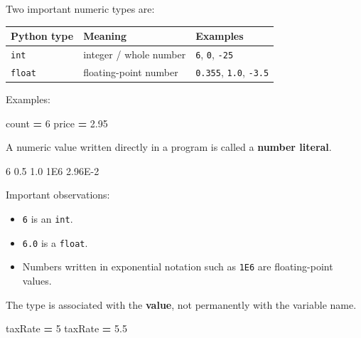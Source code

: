 \documentclass[
]{article}
\newenvironment{Shaded}{\begin{snugshade}}{\end{snugshade}}
\newcommand{\DecValTok}[1]{\textcolor[rgb]{0.00,0.00,0.81}{#1}}
\newcommand{\FloatTok}[1]{\textcolor[rgb]{0.00,0.00,0.81}{#1}}
\newcommand{\NormalTok}[1]{#1}
\newcommand{\OperatorTok}[1]{\textcolor[rgb]{0.81,0.36,0.00}{\textbf{#1}}}
\newcounter{none} %
\providecommand{\tightlist}{%
  \setlength{\itemsep}{0pt}\setlength{\parskip}{0pt}}
\begin{document}
Two important numeric types are:

{\def\LTcaptype{none} %
\begin{longtable}[]{@{}lll@{}}
\toprule\noalign{}
Python type & Meaning & Examples \\
\midrule\noalign{}
\endhead
\bottomrule\noalign{}
\endlastfoot
\texttt{int} & integer / whole number & \texttt{6}, \texttt{0},
\texttt{-25} \\
\texttt{float} & floating-point number & \texttt{0.355}, \texttt{1.0},
\texttt{-3.5} \\
\end{longtable}
}

Examples:

\begin{Shaded}
\begin{Highlighting}[]
\NormalTok{count }\OperatorTok{=} \DecValTok{6}
\NormalTok{price }\OperatorTok{=} \FloatTok{2.95}
\end{Highlighting}
\end{Shaded}

A numeric value written directly in a program is called a \textbf{number
literal}.

\begin{Shaded}
\begin{Highlighting}[]
\DecValTok{6}
\FloatTok{0.5}
\FloatTok{1.0}
\FloatTok{1E6}
\FloatTok{2.96E{-}2}
\end{Highlighting}
\end{Shaded}

Important observations:

\begin{itemize}
\tightlist
\item
  \texttt{6} is an \texttt{int}.
\item
  \texttt{6.0} is a \texttt{float}.
\item
  Numbers written in exponential notation such as \texttt{1E6} are
  floating-point values.
\end{itemize}

The type is associated with the \textbf{value}, not permanently with the
variable name.

\begin{Shaded}
\begin{Highlighting}[]
\NormalTok{taxRate }\OperatorTok{=} \DecValTok{5}
\NormalTok{taxRate }\OperatorTok{=} \FloatTok{5.5}
\end{Highlighting}
\end{Shaded}
\end{document}
